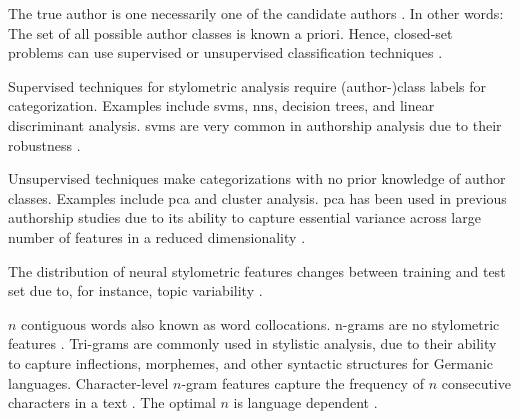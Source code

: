 \begin{definition}
    The true author is one necessarily one of the candidate authors \cite{stamatatos_survey_2009,koppel_authorship_2011,barlas_cross_domain_2020,boenninghoff_o2d2_2021,neal_surveying_2018}.
    In other words: The set of all possible author classes is known a priori.
    Hence, closed-set problems can use supervised or unsupervised classification techniques \cite{abbasi_writeprints_2008}.
\end{definition}

\begin{definition}
    Supervised techniques for stylometric analysis require (author-)class labels for categorization.
    Examples include \acp{svm}, \acp{nn}, decision trees, and linear discriminant analysis.
    \acp{svm} are very common in authorship analysis due to their robustness \cite{abbasi_writeprints_2008}.
\end{definition}

\begin{definition}
    Unsupervised techniques make categorizations with no prior knowledge of author classes.
    Examples include \ac{pca} and cluster analysis.
    \ac{pca} has been used in previous authorship studies due to its ability to 
    capture essential variance across large number of features in a reduced dimensionality \cite{abbasi_writeprints_2008}.
\end{definition}

\begin{definition}
    The distribution of neural stylometric features changes between training and test set due to, for instance, topic variability \cite{boenninghoff_o2d2_2021}.
\end{definition}

\begin{definition}
    [n-gram]
    $n$ contiguous words also known as word collocations. 
    n-grams are no stylometric features \cite{altakrori_topic_2021}.
    Tri-grams are commonly used in stylistic analysis, due to their ability to capture inflections, %
    morphemes, %
    and other syntactic structures for Germanic languages.
    Character-level $n$-gram features capture the frequency of $n$ consecutive characters in a text \cite{neal_surveying_2018}.
    The optimal $n$ is language dependent \cite{neal_surveying_2018}.
\end{definition}

